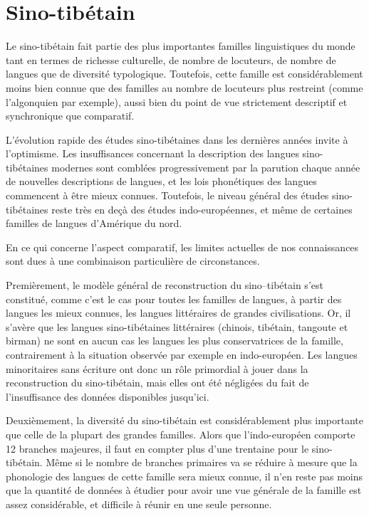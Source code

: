 \documentclass[oldfontcommands,oneside,a4paper,11pt]{memoir}
\begin{document}
\section{Sino-tibétain}
Le  sino-tibétain fait partie des plus importantes familles linguistiques du monde tant   en termes de richesse culturelle, de nombre de locuteurs, de nombre de langues que de diversité typologique. Toutefois, cette famille est considérablement moins bien connue que des familles au nombre de locuteurs plus restreint (comme l'algonquien par exemple), aussi bien du point de vue strictement descriptif et synchronique  que comparatif.

L'évolution rapide des études sino-tibétaines dans les dernières années invite à l'optimisme. Les insuffisances concernant la description des langues sino-tibétaines modernes sont comblées progressivement par la parution chaque année de nouvelles descriptions de langues, et les lois phonétiques des langues commencent à être mieux connues. Toutefois, le niveau général des études sino-tibétaines reste très en deçà des études indo-européennes, et même de certaines familles de langues d'Amérique du nord.

En ce qui concerne l'aspect comparatif, les limites actuelles de nos connaissances sont dues à une combinaison particulière de circonstances. 

Premièrement, le modèle général de reconstruction du sino--tibétain s'est constitué, comme c'est le cas pour toutes les familles de langues, à partir des langues les mieux connues, les langues littéraires de grandes civilisations. Or, il s'avère  que les langues sino-tibétaines littéraires (chinois, tibétain, tangoute et birman) ne sont en aucun cas les langues les plus conservatrices de la famille, contrairement à la situation observée par exemple en indo-européen. Les langues   minoritaires sans écriture ont donc un rôle primordial à jouer dans la reconstruction du sino-tibétain, mais elles ont été négligées du fait de l'insuffisance des données disponibles jusqu'ici.

Deuxièmement, la diversité du sino-tibétain est considérablement plus importante que celle de la plupart des grandes familles. Alors que l'indo-européen comporte 12 branches majeures, il faut en compter plus d'une trentaine pour le sino-tibétain. Même si le nombre de branches primaires va se réduire à mesure que la phonologie des langues de cette famille sera mieux connue, il n'en reste pas moins que la quantité de données à étudier pour avoir une vue générale de la famille est assez considérable, et difficile à réunir en une seule personne.
\end{document}
